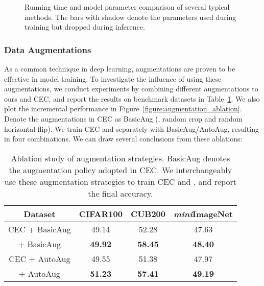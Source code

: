 	\begin{figure}[t]
	\begin{center}
	\end{center}
\caption{Running time and model parameter comparison of several typical methods.  The bars with shadow denote the parameters used during training but dropped during inference.
	} \label{figure:time_and_param}
\end{figure}

\subsubsection{Data Augmentations} \label{sec:data_aug}

As a common technique in deep learning, augmentations are proven to be effective in model training. To investigate the influence of using these augmentations, we conduct experiments by combining different augmentations to ours and CEC, and report the results on benchmark datasets in Table~\ref{tab:ablation_augmentation}. We also plot the incremental performance in Figure~\ref{figure:augmentation_ablation}. Denote the augmentations in CEC as BasicAug (\ie, random crop and random horizontal flip). We train CEC and \name separately with BasicAug/AutoAug, resulting in four combinations. We can draw several conclusions from these ablations:



	\begin{table}[t]
	\centering
	\caption{Ablation study of augmentation strategies. BasicAug denotes the augmentation policy adopted in CEC. We interchangeably use these augmentation strategies to train CEC and \mame, and report the final accuracy. }
		\begin{tabular}{cccc}
		\addlinespace
		\toprule
		Dataset& {CIFAR100} &{CUB200} & {\textit{mini}ImageNet}\\
		\midrule
		{CEC + BasicAug} &49.14 & 52.28 & 47.63 \\
		{\name + BasicAug} &\bf 49.92 & \bf 58.45 & \bf 48.40 \\
		\midrule
		{CEC + AutoAug} & 49.55& 51.38 & 47.97 \\
		{\name + AutoAug} & \bf 51.23&  \bf 57.41 & \bf 49.19 \\
		\bottomrule
	\end{tabular}
	\label{tab:ablation_augmentation}
\end{table}


